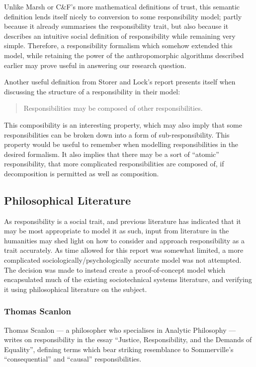 Unlike Marsh or C\&F's more mathematical definitions of trust, this semantic definition lends itself nicely to conversion to some responsibility model; partly because it already summarises the responsibility trait, but also because it describes an intuitive social definition of responsibility while remaining very simple. Therefore, a responsibility formalism which somehow extended this model, while retaining the power of the anthropomorphic algorithms described earlier may prove useful in answering our research question.\par

Another useful definition from Storer and Lock's report presents itself when discussing the structure of a responsibility in their model:

\begin{quotation}
    Responsibilities may be composed of other responsibilities.
\end{quotation}

This composibility is an interesting property, which may also imply that some responsibilities can be broken down into a form of sub-responsibility. This property would be useful to remember when modelling responsibilities in the desired formalism. It also implies that there may be a sort of ``atomic'' responsibility, that more complicated responsibilities are composed of, if decomposition is permitted as well as composition.\par

\subsection{Philosophical Literature}  %
As responsibility is a social trait, and previous literature has indicated that it may be most appropriate to model it as such, input from literature in the humanities may shed light on how to consider and approach responsibility as a trait accurately. As time allowed for this report was somewhat limited, a more complicated sociologically/psychologically accurate model was not attempted. The decision was made to instead create a proof-of-concept model which encapsulated much of the existing sociotechnical systems literature, and verifying it using philosophical literature on the subject.

\subsubsection{Thomas Scanlon}  %
Thomas Scanlon --- a philosopher who specialises in Analytic Philosophy --- writes on responsibility in the essay ``Justice, Responsibility, and the Demands of Equality'', defining terms which bear striking resemblance to Sommerville's ``consequential'' and ``causal'' responsibilities.\par

